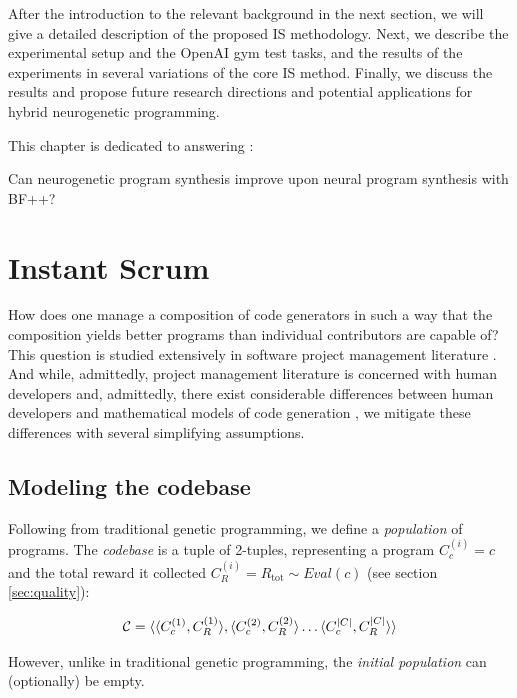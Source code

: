 After the introduction to the relevant background in the next section, we will give a detailed description of the proposed IS methodology. Next, we describe the experimental setup and the OpenAI gym test tasks, and the results of the experiments in several variations of the core IS method. Finally, we discuss the results and propose future research directions and potential applications for hybrid neurogenetic programming. 

This chapter is dedicated to answering \rqneurogen:

\begin{highlight}
    Can neurogenetic program synthesis improve upon neural program synthesis with BF++?
\end{highlight}

\newpage
\section{Instant Scrum}

How does one manage a composition of code generators in such a way that the composition yields better programs than individual contributors are capable of? 
This question is studied extensively in software project management literature \cite{mythicalmanmonth}.
And while, admittedly, project management literature is concerned with human developers and, admittedly, there exist considerable differences between human developers and mathematical models of code generation \cite{bugfixing}, we mitigate these differences with several simplifying assumptions.

\subsection{Modeling the codebase}

Following from traditional genetic programming, we define a \emph{population} of programs. 
The \emph{codebase} is a tuple of 2-tuples, representing a program $C_c^{(i)}=c$ and the total reward it collected $C_R^{(i)}=R_\text{tot} \sim \mathit{Eval}(c)$ (see section \ref{sec:quality}):

\begin{equation}
    \mathcal{C} = \langle \langle C_c^{(1)}, C_R^{(1)} \rangle, \langle C_c^{(2)}, C_R^{(2)} \rangle \dots \langle C_c^{|C|}, C_R^{|C|} \rangle \rangle
\end{equation}

However, unlike in traditional genetic programming, the \emph{initial population} can (optionally) be empty.

